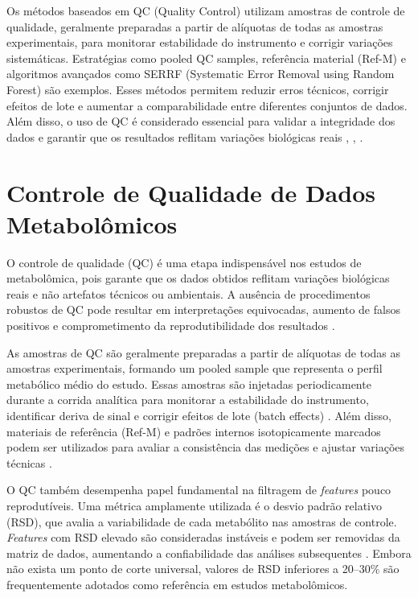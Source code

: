 Os métodos baseados em QC (Quality Control) utilizam amostras de controle de qualidade, geralmente preparadas a partir de alíquotas de todas as amostras experimentais, para monitorar estabilidade do instrumento e corrigir variações sistemáticas. Estratégias como pooled QC samples, referência material (Ref-M) e algoritmos avançados como SERRF (Systematic Error Removal using Random Forest) são exemplos. Esses métodos permitem reduzir erros técnicos, corrigir efeitos de lote e aumentar a comparabilidade entre diferentes conjuntos de dados. Além disso, o uso de QC é considerado essencial para validar a integridade dos dados e garantir que os resultados reflitam variações biológicas reais \cite{yao2022normalization}, \cite{fan2019systematic}, \cite{drotleff2019guidelines}.

\section{\textbf{Controle de Qualidade de Dados Metabolômicos}}

O controle de qualidade (QC) é uma etapa indispensável nos estudos de metabolômica, pois garante que os dados obtidos reflitam variações biológicas reais e não artefatos técnicos ou ambientais. A ausência de procedimentos robustos de QC pode resultar em interpretações equivocadas, aumento de falsos positivos e comprometimento da reprodutibilidade dos resultados \cite{datanor}. 

As amostras de QC são geralmente preparadas a partir de alíquotas de todas as amostras experimentais, formando um pooled sample que representa o perfil metabólico médio do estudo. Essas amostras são injetadas periodicamente durante a corrida analítica para monitorar a estabilidade do instrumento, identificar deriva de sinal e corrigir efeitos de lote (batch effects) \cite{fan2019systematic}. Além disso, materiais de referência (Ref-M) e padrões internos isotopicamente marcados podem ser utilizados para avaliar a consistência das medições e ajustar variações técnicas \cite{drotleff2019guidelines}.

O QC também desempenha papel fundamental na filtragem de \textit{features} pouco reprodutíveis. Uma métrica amplamente utilizada é o desvio padrão relativo (RSD), que avalia a variabilidade de cada metabólito nas amostras de controle. \textit{Features} com RSD elevado são consideradas instáveis e podem ser removidas da matriz de dados, aumentando a confiabilidade das análises subsequentes \cite{yao2022normalization}. Embora não exista um ponto de corte universal, valores de RSD inferiores a 20–30\% são frequentemente adotados como referência em estudos metabolômicos.

